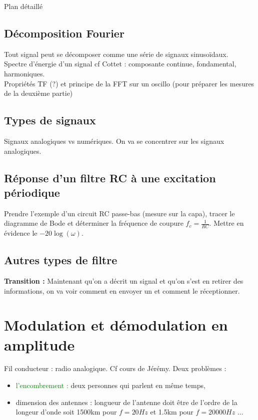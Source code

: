 \begin{reportBlock}{Plan détaillé}
\subsection{Décomposition Fourier}
Tout signal peut se décomposer comme une série de signaux sinusoïdaux.\\

Spectre d'énergie d'un signal cf Cottet : composante continue, fondamental, harmoniques.\\

Propriétés TF (?) et principe de la FFT sur un oscillo (pour préparer les mesures de la deuxième partie)

\subsection{Types de signaux}
Signaux analogiques vs numériques. On va se concentrer sur les signaux analogiques.


\subsection{Réponse d'un filtre RC à une excitation périodique}
Prendre l'exemple d'un circuit RC passe-bas (mesure sur la capa), tracer le diagramme de Bode et déterminer la fréquence de coupure $f_c = \frac{1}{RC}$. Mettre en évidence le $-20\log(\omega)$.

\subsection{Autres types de filtre}
\textbf{Transition :} Maintenant qu'on a décrit un signal et qu'on s'est en retirer des informations, on va voir comment en envoyer un et comment le réceptionner.

\section{Modulation et démodulation en amplitude}
Fil conducteur : radio analogique. Cf cours de Jérémy.
Deux problèmes : 
\begin{itemize}
    \item \textcolor{green}{l'encombrement :} deux personnes qui parlent en même temps,
    \item dimension des antennes : longueur de l'antenne doit être de l'ordre de la longeur d'onde soit 1500km pour $f=20Hz$ et 1.5km pour $f=20000Hz$ ...
\end{itemize}


\end{reportBlock}
